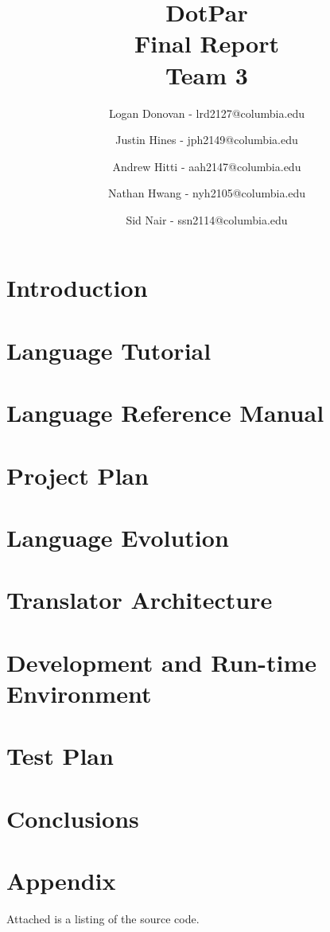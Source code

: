 \documentclass[11pt]{article}
\begin{document}
\title{DotPar \\ Final Report \\ Team 3}
\author{
Logan Donovan - lrd2127@columbia.edu \and
Justin Hines - jph2149@columbia.edu \and
Andrew Hitti - aah2147@columbia.edu \and
Nathan Hwang - nyh2105@columbia.edu \and
Sid Nair - ssn2114@columbia.edu}
\maketitle

\tableofcontents
\newpage
\part{Introduction}


\part{Language Tutorial}


\part{Language Reference Manual}


\part{Project Plan}



\part{Language Evolution}


\part{Translator Architecture}


\part{Development and Run-time Environment}


\part{Test Plan}


\part{Conclusions}


\part{Appendix}
Attached is a listing of the source code.

\end{document}
